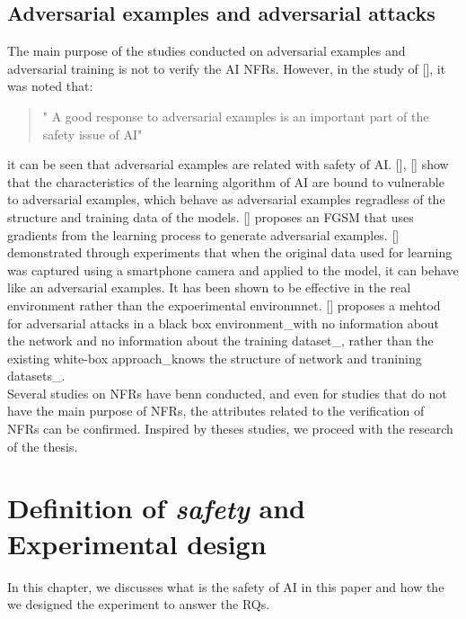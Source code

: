 \documentclass[journal,article,submit,moreauthors,pdftex]{Definitions/mdpi}
\begin{document}
\subsection{Adversarial examples and adversarial attacks}

The main purpose of the studies conducted on adversarial examples and adversarial training is not to verify the AI NFRs.
However, in the study of [], it was noted that:
\begin{quote}
   " A good response to adversarial examples is an important part of the safety issue of AI"
\end{quote}
it can be seen that adversarial examples are related with safety of AI.
[], [] show that the characteristics of the learning algorithm of AI are bound to vulnerable to adversarial examples, which behave as adversarial examples regradless of the structure and training data of the models.
[] proposes an FGSM that uses gradients from the learning process to generate adversarial examples.
[] demonstrated through experiments that when the original data used for learning was captured using a smartphone camera and applied to the model, it can behave like an adversarial examples. It has been shown to be effective in the real environment rather than the expoerimental environmnet.
[] proposes a mehtod for adversarial attacks in a black box environment\_with no information about the network and no information about the training dataset\_, rather than the existing white-box approach\_knows the structure of network and tranining datasets\_. \\

Several studies on NFRs have benn conducted, and even for studies that do not have the main purpose of NFRs, the attributes related to the verification of NFRs can be confirmed.
Inspired by theses studies, we proceed with the research of the thesis.

\section{Definition of {\it safety} and Experimental design} %


In this chapter, we discusses what is the safety of AI in this paper and how the we designed the experiment to answer the RQs.
\end{document}
